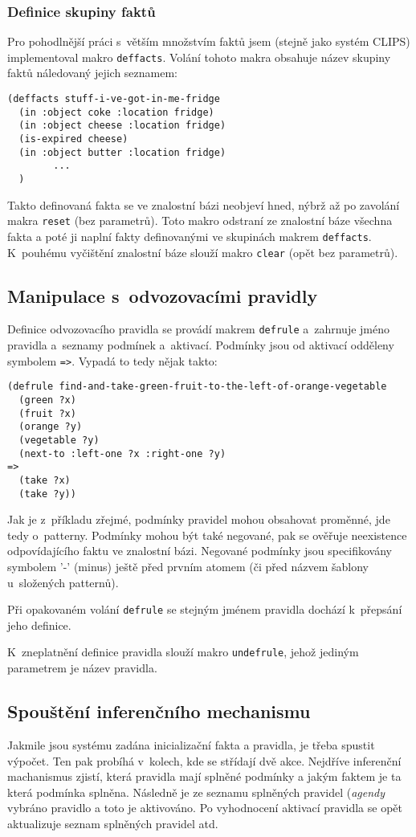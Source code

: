 \subsubsection{Definice skupiny faktů}
Pro pohodlnější práci s~větším množstvím faktů jsem (stejně jako systém
CLIPS) implementoval makro \verb|deffacts|. Volání tohoto makra obsahuje
název skupiny faktů náledovaný jejich seznamem:
\begin{verbatim}
(deffacts stuff-i-ve-got-in-me-fridge
  (in :object coke :location fridge)
  (in :object cheese :location fridge)
  (is-expired cheese)
  (in :object butter :location fridge)
        ...
  )
\end{verbatim}
Takto definovaná fakta se ve znalostní bázi neobjeví hned, nýbrž až po zavolání
makra \verb|reset| (bez parametrů). Toto makro odstraní ze znalostní báze
všechna fakta a poté ji naplní fakty definovanými ve skupinách makrem
\verb|deffacts|. K~pouhému vyčištění znalostní báze slouží makro \verb|clear|
(opět bez parametrů).
\subsection{Manipulace s~odvozovacími pravidly}
Definice odvozovacího pravidla se provádí makrem \verb|defrule| a~zahrnuje jméno
pravidla a~seznamy podmínek a~aktivací. Podmínky jsou od aktivací odděleny
symbolem \verb|=>|. Vypadá to tedy nějak takto:
\begin{verbatim}
(defrule find-and-take-green-fruit-to-the-left-of-orange-vegetable
  (green ?x)
  (fruit ?x)
  (orange ?y)
  (vegetable ?y)
  (next-to :left-one ?x :right-one ?y)
=>
  (take ?x)
  (take ?y))
\end{verbatim}
Jak je z~příkladu zřejmé, podmínky pravidel mohou obsahovat proměnné, jde tedy
o~patterny. Podmínky mohou být také negované, pak se ověřuje neexistence
odpovídajícího faktu ve znalostní bázi. Negované podmínky jsou specifikovány
symbolem '-' (minus) ještě před prvním atomem (či před názvem šablony u~složených
patternů).

Při opakovaném volání \verb|defrule| se stejným jménem pravidla dochází 
k~přepsání jeho definice.

K~zneplatnění definice pravidla slouží makro \verb|undefrule|, jehož jediným
parametrem je název pravidla.
\subsection{Spouštění inferenčního mechanismu}
Jakmile jsou systému zadána inicializační fakta a pravidla, je třeba spustit
výpočet. Ten pak probíhá v~kolech, kde se střídají dvě akce. Nejdříve inferenční
machanismus zjistí, která pravidla mají splněné podmínky a jakým faktem je ta
která podmínka splněna. Následně je ze seznamu splněných pravidel (\emph{agendy}
vybráno pravidlo a toto je aktivováno. Po vyhodnocení aktivací pravidla se opět
aktualizuje seznam splněných pravidel atd.

